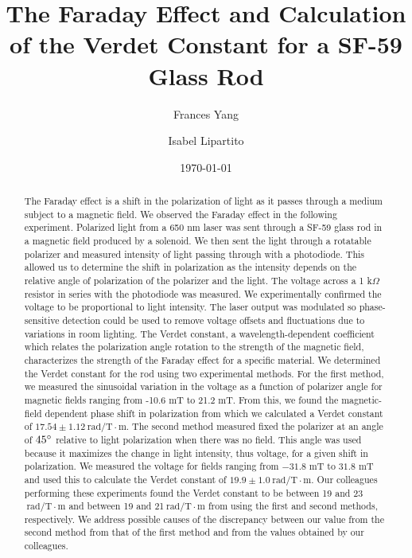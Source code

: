 \documentclass[prb,preprint]{revtex4-1}
\begin{document}
\title{The Faraday Effect and Calculation of the Verdet Constant for a SF-59 Glass Rod}

\author{Frances Yang}

\author{Isabel Lipartito}

\date{\today}

\begin{abstract}
{The Faraday effect is a shift in the polarization of light as it passes through a medium subject to a magnetic field. We observed the Faraday effect in the following experiment. Polarized light from a 650 nm laser was sent through a SF-59 glass rod in a magnetic field produced by a solenoid. 
We then sent the light through a rotatable polarizer and measured intensity of light passing through with a photodiode. 
This allowed us to determine the shift in polarization as the intensity depends on the relative angle of polarization of the polarizer and the light. 
The voltage across a 1 k$\Omega$ resistor in series with the photodiode was measured. We experimentally confirmed the voltage to be proportional to light intensity.
The laser output was modulated so phase-sensitive detection could be used to remove voltage offsets and fluctuations due to variations in room lighting.
The Verdet constant, a wavelength-dependent coefficient which relates the polarization angle rotation to the strength of the magnetic field, characterizes the strength of the Faraday effect for a specific material.  
We determined the Verdet constant for the rod using two experimental methods.
For the first method, we measured the sinusoidal variation in the voltage as a function of polarizer angle for magnetic fields ranging from -10.6 mT to 21.2 mT. From this, we found the magnetic-field dependent phase shift in polarization from which we calculated a Verdet constant of $17.54 \pm 1.12 \mathrm{~rad/T} \cdot \textrm{m}$.
The second method measured fixed the polarizer at an angle of $45\degree$ relative to light polarization when there was no field. This angle was used because it maximizes the change in light intensity, thus voltage, for a given shift in polarization. 
We measured the voltage for fields ranging from $-31.8$ mT to $31.8$ mT and used this to calculate the Verdet constant of $19.9 \pm 1.0 \mathrm{~rad/T} \cdot \textrm{m}$.
Our colleagues performing these experiments found the Verdet constant to be between 19 and 23$\mathrm{~rad/T} \cdot \textrm{m}$ and between 19 and 21$\mathrm{~rad/T} \cdot \textrm{m}$ from using the first and second methods, respectively.  
We address possible causes of the discrepancy between our value from the second method from that of the first method and from the values obtained by our colleagues.}
\end{abstract}
\end{document}

